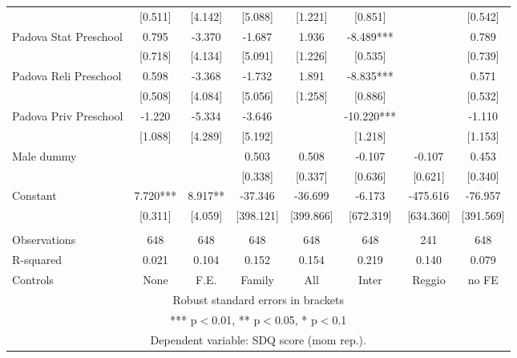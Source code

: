\begin{tabular}{lccccccc}
 & [0.511] & [4.142] & [5.088] & [1.221] & [0.851] &  & [0.542] \\
Padova Stat Preschool & 0.795 & -3.370 & -1.687 & 1.936 & -8.489*** &  & 0.789 \\
 & [0.718] & [4.134] & [5.091] & [1.226] & [0.535] &  & [0.739] \\
Padova Reli Preschool & 0.598 & -3.368 & -1.732 & 1.891 & -8.835*** &  & 0.571 \\
 & [0.508] & [4.084] & [5.056] & [1.258] & [0.886] &  & [0.532] \\
Padova Priv Preschool & -1.220 & -5.334 & -3.646 &  & -10.220*** &  & -1.110 \\
 & [1.088] & [4.289] & [5.192] &  & [1.218] &  & [1.153] \\
Male dummy &  &  & 0.503 & 0.508 & -0.107 & -0.107 & 0.453 \\
 &  &  & [0.338] & [0.337] & [0.636] & [0.621] & [0.340] \\
Constant & 7.720*** & 8.917** & -37.346 & -36.699 & -6.173 & -475.616 & -76.957 \\
 & [0.311] & [4.059] & [398.121] & [399.866] & [672.319] & [634.360] & [391.569] \\
 &  &  &  &  &  &  &  \\
Observations & 648 & 648 & 648 & 648 & 648 & 241 & 648 \\
R-squared & 0.021 & 0.104 & 0.152 & 0.154 & 0.219 & 0.140 & 0.079 \\
 Controls & None & F.E. & Family & All & Inter & Reggio & no FE \\ \hline
\multicolumn{8}{c}{ Robust standard errors in brackets} \\
\multicolumn{8}{c}{ *** p$<$0.01, ** p$<$0.05, * p$<$0.1} \\
\multicolumn{8}{c}{ Dependent variable: SDQ score (mom rep.).} \\
\end{tabular}
